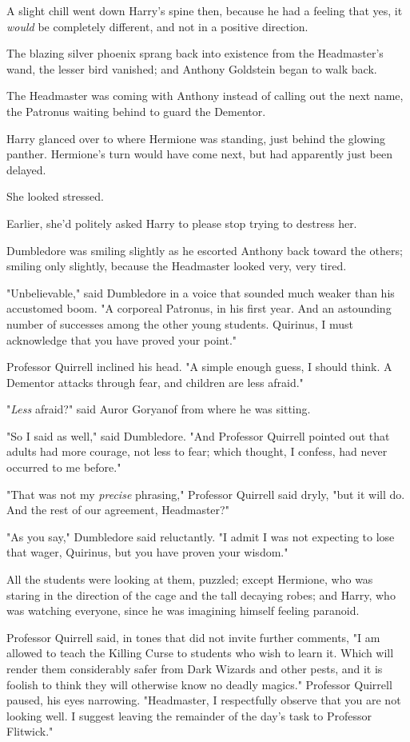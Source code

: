 A slight chill went down Harry's spine then, because he had a feeling that yes, 
it \emph{would} be completely different, and not in a positive direction.

The blazing silver phoenix sprang back into existence from the Headmaster's 
wand, the lesser bird vanished; and Anthony Goldstein began to walk back.

The Headmaster was coming with Anthony instead of calling out the next name, 
the Patronus waiting behind to guard the Dementor.

Harry glanced over to where Hermione was standing, just behind the glowing 
panther. Hermione's turn would have come next, but had apparently just been 
delayed.

She looked stressed.

Earlier, she'd politely asked Harry to please stop trying to destress her.

Dumbledore was smiling slightly as he escorted Anthony back toward the others; 
smiling only slightly, because the Headmaster looked very, very tired.

"Unbelievable," said Dumbledore in a voice that sounded much weaker than his 
accustomed boom. "A corporeal Patronus, in his first year. And an astounding 
number of successes among the other young students. Quirinus, I must 
acknowledge that you have proved your point."

Professor Quirrell inclined his head. "A simple enough guess, I should think. A 
Dementor attacks through fear, and children are less afraid."

"\emph{Less} afraid?" said Auror Goryanof from where he was sitting.

"So I said as well," said Dumbledore. "And Professor Quirrell pointed out that 
adults had more courage, not less to fear; which thought, I confess, had never 
occurred to me before."

"That was not my \emph{precise} phrasing," Professor Quirrell said dryly, "but 
it will do. And the rest of our agreement, Headmaster?"

"As you say," Dumbledore said reluctantly. "I admit I was not expecting to lose 
that wager, Quirinus, but you have proven your wisdom."

All the students were looking at them, puzzled; except Hermione, who was 
staring in the direction of the cage and the tall decaying robes; and Harry, 
who was watching everyone, since he was imagining himself feeling paranoid.

Professor Quirrell said, in tones that did not invite further comments, "I am 
allowed to teach the Killing Curse to students who wish to learn it. Which will 
render them considerably safer from Dark Wizards and other pests, and it is 
foolish to think they will otherwise know no deadly magics." Professor Quirrell 
paused, his eyes narrowing. "Headmaster, I respectfully observe that you are 
not looking well. I suggest leaving the remainder of the day's task to 
Professor Flitwick."

